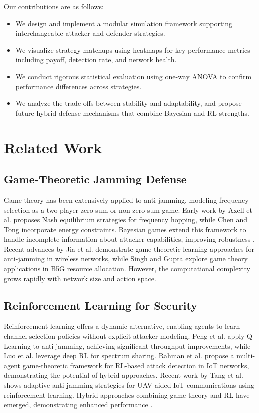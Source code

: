 \documentclass[conference]{IEEEtran}
\begin{document}
Our contributions are as follows:
\begin{itemize}
  \item We design and implement a modular simulation framework supporting interchangeable attacker and defender strategies.  
  \item We visualize strategy matchups using heatmaps for key performance metrics including payoff, detection rate, and network health.  
  \item We conduct rigorous statistical evaluation using one-way ANOVA to confirm performance differences across strategies.  
  \item We analyze the trade-offs between stability and adaptability, and propose future hybrid defense mechanisms that combine Bayesian and RL strengths.  
\end{itemize}

\section{Related Work}
\subsection{Game-Theoretic Jamming Defense}
Game theory has been extensively applied to anti-jamming, modeling frequency selection as a two-player zero-sum or non-zero-sum game. Early work by Axell et al. \cite{axell2012detection} proposes Nash equilibrium strategies for frequency hopping, while Chen and Tong \cite{chen2019anti} incorporate energy constraints. Bayesian games extend this framework to handle incomplete information about attacker capabilities, improving robustness \cite{alpcan2007game,khouzani2012evolving}. Recent advances by Jia et al. \cite{jia2022game} demonstrate game-theoretic learning approaches for anti-jamming in wireless networks, while Singh and Gupta \cite{resource2023slicing} explore game theory applications in B5G resource allocation. However, the computational complexity grows rapidly with network size and action space.

\subsection{Reinforcement Learning for Security}
Reinforcement learning offers a dynamic alternative, enabling agents to learn channel-selection policies without explicit attacker modeling. Peng et al. \cite{peng2017anti} apply Q-Learning to anti-jamming, achieving significant throughput improvements, while Luo et al. \cite{luo2018anti} leverage deep RL for spectrum sharing. Rahman et al. \cite{rahman2023rlbased} propose a multi-agent game-theoretic framework for RL-based attack detection in IoT networks, demonstrating the potential of hybrid approaches. Recent work by Tang et al. \cite{tang2024adaptive} shows adaptive anti-jamming strategies for UAV-aided IoT communications using reinforcement learning. Hybrid approaches combining game theory and RL have emerged, demonstrating enhanced performance \cite{zhao2020hybrid,li2021game}.
\end{document}
